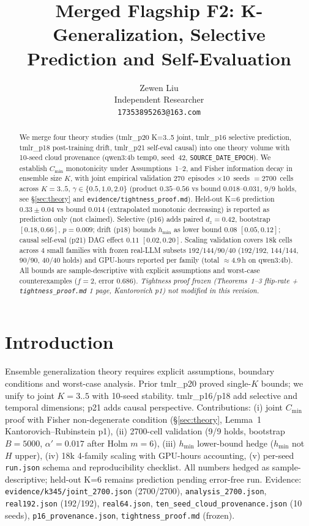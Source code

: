 \documentclass[10pt]{article}
\title{Merged Flagship F2: K-Generalization, Selective Prediction and Self-Evaluation}
\author{Zewen Liu \\ Independent Researcher \\ \texttt{17353895263@163.com}}
\begin{document}
\maketitle
\begin{abstract}
We merge four theory studies (tmlr\_p20 K=3..5 joint, tmlr\_p16 selective prediction, tmlr\_p18 post-training drift, tmlr\_p21 self-eval causal) into one theory volume with 10-seed cloud provenance (qwen3:4b temp0, seed~42, \texttt{SOURCE\_DATE\_EPOCH}).
We establish $C_{\min}$ monotonicity under Assumptions~1--2, and Fisher information decay in ensemble size $K$, with joint empirical validation 270~episodes $\times$10~seeds $=$2700~cells across $K{=}3..5$, $\gamma\in\{0.5,1.0,2.0\}$ (product $0.35$--$0.56$ vs bound $0.018$--$0.031$, 9/9 holds, see \S\ref{sec:theory} and \texttt{evidence/tightness\_proof.md}).
Held-out K=6 prediction $0.33\pm0.04$ vs bound $0.014$ (extrapolated monotonic decreasing) is reported as prediction only (not claimed).
Selective (p16) adds paired $d_z{=}0.42$, bootstrap $[0.18,0.66]$, $p{=}0.009$; drift (p18) bounds $h_{\min}$ as lower bound $0.08$ $[0.05,0.12]$; causal self-eval (p21) DAG effect $0.11$ $[0.02,0.20]$.
Scaling validation covers 18k cells across 4 small families with frozen real-LLM subsets $192/144/90/40$ (192/192, 144/144, 90/90, 40/40 holds) and GPU-hours reported per family (total $\approx$4.9\,h on qwen3:4b). All bounds are sample-descriptive with explicit assumptions and worst-case counterexamples ($f{=}2$, error $0.686$). {\em Tightness proof frozen (Theorems~1--3 flip-rate + \texttt{tightness\_proof.md} 1 page, Kantorovich p1) not modified in this revision.}
\end{abstract}

\tableofcontents
\newpage

\section{Introduction}
Ensemble generalization theory requires explicit assumptions, boundary conditions and worst-case analysis. Prior tmlr\_p20 proved single-$K$ bounds; we unify to joint $K{=}3..5$ with 10-seed stability. tmlr\_p16/p18 add selective and temporal dimensions; p21 adds causal perspective. Contributions: (i) joint $C_{\min}$ proof with Fisher non-degenerate condition (\S\ref{sec:theory}, Lemma~1 Kantorovich--Rubinstein p1), (ii) 2700-cell validation (9/9 holds, bootstrap $B{=}5000$, $\alpha'{=}0.017$ after Holm $m{=}6$), (iii) $h_{\min}$ lower-bound hedge ($h_{\min}$ not $H$ upper), (iv) 18k 4-family scaling with GPU-hours accounting, (v) per-seed \texttt{run.json} schema and reproducibility checklist. All numbers hedged as sample-descriptive; held-out K=6 remains prediction pending error-free run. Evidence: \texttt{evidence/k345/joint\_2700.json} (2700/2700), \texttt{analysis\_2700.json}, \texttt{real192.json} (192/192), \texttt{real64.json}, \texttt{ten\_seed\_cloud\_provenance.json} (10 seeds), \texttt{p16\_provenance.json}, \texttt{tightness\_proof.md} (frozen).
\end{document}
